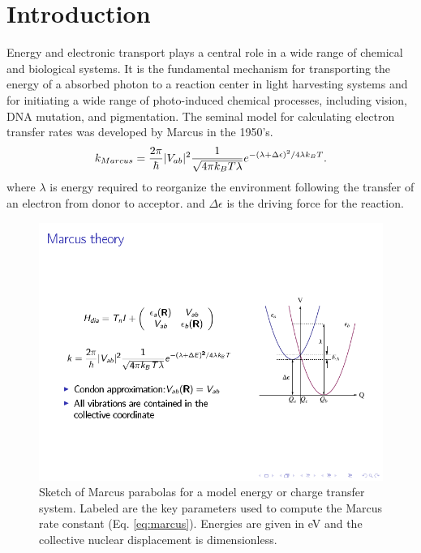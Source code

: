 \section{Introduction}
\label{sec:intro}

Energy and electronic transport plays a central role in a
wide range of  chemical  and biological systems.
It is the fundamental mechanism for transporting the  energy  of a
absorbed photon to a reaction center in light harvesting systems
and for initiating a wide range of photo-induced  chemical processes,
including vision, DNA mutation, and pigmentation.
The seminal model for calculating electron transfer rates was developed by
Marcus in the 1950's\cite{marcus1956theory,marcus1965theory,marcus1993electron}.
\begin{equation}
k_{Marcus}=\frac{2\pi}{\hbar}|V_{ab}|^{2}\frac{1}{\sqrt{4\text{\ensuremath{\pi}}k_{B}T\lambda}}e^{-(\lambda+ \Delta\epsilon)^{2}/4\text{\ensuremath{\lambda}}k_{B}T}.\label{eq:marcus}
\end{equation}
where $\lambda$ is  energy required to reorganize the environment
following the transfer of an electron from donor to acceptor.
and $\Delta \epsilon$ is the driving force for the reaction.

\begin{figure}[h]
\includegraphics[width=0.5\columnwidth]{Chapters/chap2/Figure1}
\caption{Sketch of Marcus parabolas for a model energy or charge transfer system.
Labeled are the key parameters used to compute the Marcus rate constant (Eq. \ref{eq:marcus}).
Energies are given in eV and the collective nuclear displacement  is dimensionless.
}
\label{marcus}
\end{figure}


